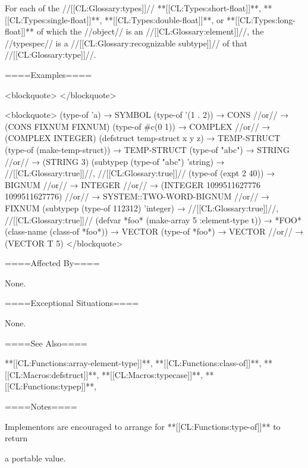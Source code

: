  For each of the //[[CL:Glossary:types]]// **[[CL:Types:short-float]]**, **[[CL:Types:single-float]]**, **[[CL:Types:double-float]]**, or **[[CL:Types:long-float]]** of which the //object// is an //[[CL:Glossary:element]]//, the //typespec// is a //[[CL:Glossary:recognizable subtype]]// of that //[[CL:Glossary:type]]//.

\endlist



====Examples====

<blockquote> </blockquote>

<blockquote> (type-of 'a) → SYMBOL (type-of '(1 . 2)) → CONS //or// → (CONS FIXNUM FIXNUM) (type-of #c(0 1)) → COMPLEX //or// → (COMPLEX INTEGER) (defstruct temp-struct x y z) → TEMP-STRUCT (type-of (make-temp-struct)) → TEMP-STRUCT (type-of "abc") → STRING //or// → (STRING 3) (subtypep (type-of "abc") 'string) → //[[CL:Glossary:true]]//, //[[CL:Glossary:true]]// (type-of (expt 2 40)) → BIGNUM //or// → INTEGER //or// → (INTEGER 1099511627776 1099511627776) //or// → SYSTEM::TWO-WORD-BIGNUM //or// → FIXNUM (subtypep (type-of 112312) 'integer) → //[[CL:Glossary:true]]//, //[[CL:Glossary:true]]// (defvar *foo* (make-array 5 :element-type t)) → *FOO* (class-name (class-of *foo*)) → VECTOR (type-of *foo*) → VECTOR //or// → (VECTOR T 5) </blockquote>

====Affected By====

None.

====Exceptional Situations====

None.

====See Also====

**[[CL:Functions:array-element-type]]**, **[[CL:Functions:class-of]]**, **[[CL:Macros:defstruct]]**, **[[CL:Macros:typecase]]**, **[[CL:Functions:typep]]**, {\secref\Types}

====Notes====

Implementors are encouraged to arrange for **[[CL:Functions:type-of]]** to return

a portable value.



    
